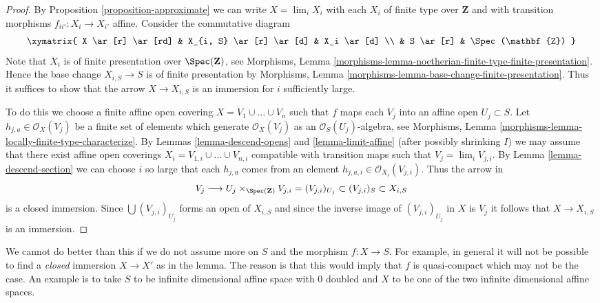 \begin{proof}
By
Proposition \ref{proposition-approximate}
we can write
$X = \lim_i X_i$ with each $X_i$ of finite type over $\mathbf{Z}$ and
with transition morphisms $f_{ii'} : X_i \to X_{i'}$ affine.
Consider the commutative diagram
$$
\xymatrix{
X \ar[r] \ar[rd] & X_{i, S} \ar[r] \ar[d] & X_i \ar[d] \\
& S \ar[r] & \Spec(\mathbf{Z})
}
$$
Note that $X_i$ is of finite presentation over $\Spec(\mathbf{Z})$, see
Morphisms,
Lemma \ref{morphisms-lemma-noetherian-finite-type-finite-presentation}.
Hence the base change $X_{i, S} \to S$ is of finite presentation by
Morphisms, Lemma \ref{morphisms-lemma-base-change-finite-presentation}.
Thus it suffices to show that the arrow $X \to X_{i, S}$ is an
immersion for $i$ sufficiently large.

\medskip\noindent
To do this we choose a finite affine open covering
$X = V_1 \cup \ldots \cup V_n$ such that
$f$ maps each $V_j$ into an affine open $U_j \subset S$.
Let $h_{j, a} \in \mathcal{O}_X(V_j)$ be a finite
set of elements which generate $\mathcal{O}_X(V_j)$ as
an $\mathcal{O}_S(U_j)$-algebra, see
Morphisms, Lemma \ref{morphisms-lemma-locally-finite-type-characterize}.
By Lemmas \ref{lemma-descend-opens} and \ref{lemma-limit-affine}
(after possibly shrinking $I$) we may assume that
there exist affine open coverings
$X_i = V_{1, i} \cup \ldots \cup V_{n, i}$
compatible with transition maps such that $V_j = \lim_i V_{j, i}$.
By Lemma \ref{lemma-descend-section} we can choose $i$ so large that each
$h_{j, a}$ comes from an element
$h_{j, a, i} \in \mathcal{O}_{X_i}(V_{j, i})$.
Thus the arrow in
$$
V_j \longrightarrow U_j \times_{\Spec(\mathbf{Z})} V_{j, i} =
(V_{j, i})_{U_j} \subset (V_{j, i})_S \subset X_{i, S}
$$
is a closed immersion. Since $\bigcup (V_{j, i})_{U_j}$ forms an open of
$X_{i, S}$ and since the inverse image of $(V_{j, i})_{U_j}$ in $X$
is $V_j$ it follows that $X \to X_{i, S}$ is an immersion.
\end{proof}

\begin{remark}
\label{remark-cannot-do-better}
We cannot do better than this if we do not assume
more on $S$ and the morphism $f : X \to S$.
For example, in general it will not be possible to
find a {\it closed} immersion $X \to X'$ as in the lemma.
The reason is that this would imply that $f$ is quasi-compact which
may not be the case. An example is to take $S$ to be infinite
dimensional affine space with $0$ doubled and $X$ to be one of
the two infinite dimensional affine spaces.
\end{remark}

